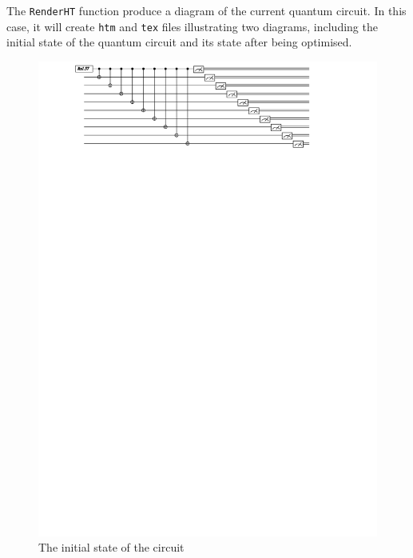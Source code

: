 \documentclass[12pt]{third-rep}
\begin{document}
The \texttt{RenderHT} function produce a diagram of the current quantum circuit. In this case, it will create \texttt{htm} and \texttt{tex} files illustrating two diagrams, including the initial state of the quantum circuit and its state after being optimised.
\begin{figure}[ht]
\centering
\includegraphics[width=15cm]{circuit1}
\caption{The initial state of the circuit}
\end{figure}
\end{document}

